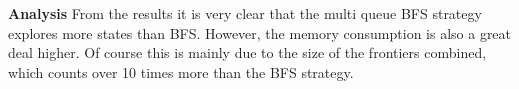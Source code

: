 \textbf{Analysis}
From the results it is very clear that the multi queue BFS strategy explores more states than BFS. However, the memory consumption is also a great deal higher. Of course this is mainly due to the size of the frontiers combined, which counts over 10 times more than the BFS strategy. 








